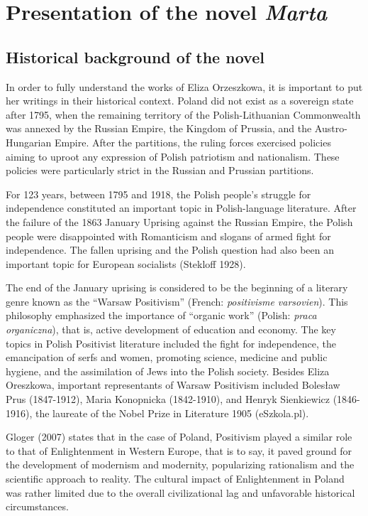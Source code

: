 \chapter{Presentation of the novel \textit{Marta}}

\section{Historical background of the novel}

In order to fully understand the works of Eliza Orzeszkowa, it is important to put her writings in their historical context.
Poland did not exist as a sovereign state after 1795, when the remaining territory of the Polish-Lithuanian Commonwealth was annexed by the Russian Empire, the  Kingdom of Prussia, and the Austro-Hungarian Empire.
After the partitions, the ruling forces exercised policies aiming to uproot any expression of Polish patriotism and nationalism. These policies were particularly strict in the Russian and Prussian partitions.

For 123 years, between 1795 and 1918, the Polish people's struggle for independence constituted an important topic in Polish-language literature.
After the failure of the 1863 January Uprising against the Russian Empire, the Polish people were disappointed with Romanticism and slogans of armed fight for independence.
The fallen uprising and the Polish question had also been an important topic for European socialists
(Stekloff 1928).

The end of the January uprising is considered to be the beginning of a literary genre known as the ``Warsaw Positivism'' (French: \textit{positivisme varsovien}).
This philosophy emphasized the importance of ``organic work'' (Polish: \textit{praca organiczna}), that is, active development of education and economy.
The key topics in Polish Positivist literature included the fight for independence, the emancipation of serfs and women, promoting science, medicine and public hygiene, and the assimilation of Jews into the Polish society.
Besides Eliza Oreszkowa, important representants of Warsaw Positivism included Bolesław Prus (1847-1912), Maria Konopnicka (1842-1910), and Henryk Sienkiewicz (1846-1916), the laureate of the Nobel Prize in Literature 1905
(eSzkola.pl).

Gloger (2007) states that in the case of Poland, Positivism played a similar role to that of Enlightenment in Western Europe, that is to say, it paved ground for the development of modernism and modernity, popularizing rationalism and the scientific approach to reality. The cultural impact of Enlightenment in Poland was rather limited due to the overall civilizational lag and unfavorable historical circumstances.

